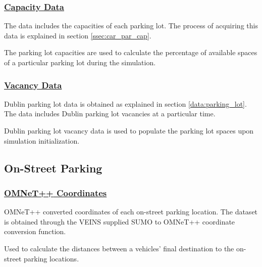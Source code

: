 \subsubsection{\underline{Capacity Data}}
\begin{description}[leftmargin=8em,style=nextline]
  \item[Explanation] The data includes the capacities of each parking lot. The process of acquiring this data is explained in section \ref{ssec:car_par_cap}.
  \item[Purpose] The parking lot capacities are used to calculate the percentage of available spaces of a particular parking lot during the simulation.
\end{description}

\subsubsection{\underline{Vacancy Data}}
\begin{description}[leftmargin=8em,style=nextline]
  \item[Explanation] Dublin parking lot data is obtained as explained in section \ref{data:parking_lot}. The data includes Dublin parking lot vacancies at a particular time.
  \item[Purpose] Dublin parking lot vacancy data is used to populate the parking lot spaces upon simulation initialization.
\end{description}



\subsection{On-Street Parking}
\subsubsection{\underline{\ac{OMNeT++} Coordinates}}
\begin{description}[leftmargin=8em,style=nextline]
  \item[Explanation] \ac{OMNeT++} converted coordinates of each on-street parking location. The dataset is obtained through the \ac{VEINS} supplied \ac{SUMO} to \ac{OMNeT++} coordinate conversion function.
  \item[Purpose] Used to calculate the distances between a vehicles' final destination to the on-street parking locations.
\end{description}

